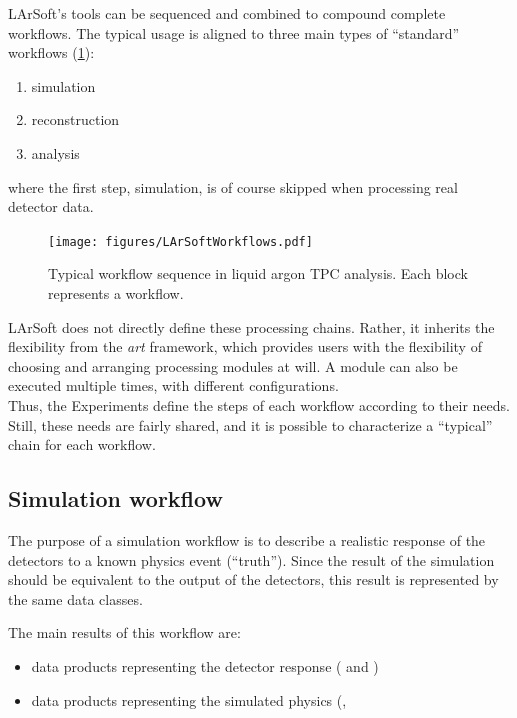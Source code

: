 
LArSoft's tools can be sequenced and combined to compound complete workflows.
The typical usage is aligned to three main types of ``standard'' workflows (\cref{fig:LArSoftProcessingChain}):
\begin{enumerate}
  \item simulation
  \item reconstruction
  \item analysis
\end{enumerate}
where the first step, simulation, is of course skipped when processing real detector data.
\begin{figure}[htbp]
  \centering
  \texttt{[image: figures/LArSoftWorkflows.pdf]}
  \caption{\label{fig:LArSoftProcessingChain}Typical workflow sequence in liquid argon TPC analysis. Each block represents a workflow.}
\end{figure}
LArSoft does not directly define these processing chains.
Rather, it inherits the flexibility from the \emph{art} framework,
which provides users with the flexibility of choosing and arranging
processing modules at will. %
A module can also be executed multiple times, with different configurations.\\
Thus, the Experiments define the steps of each workflow according to their
needs.
Still, these needs are fairly shared,
and it is possible to characterize a ``typical'' chain for each workflow.


\subsection{Simulation workflow}
\label{ssec:Workflows:Simulation}

The purpose of a simulation workflow is to describe a realistic response of
the detectors to a known physics event (``truth'').
Since the result of the simulation should be equivalent to the output of the detectors,
this result is represented by the same data classes.

The main results of this workflow are:
\begin{itemize}
	\item data products representing the detector response (\eg {} and )
	\item data products representing the simulated physics (\eg {}, 
\end{itemize}


